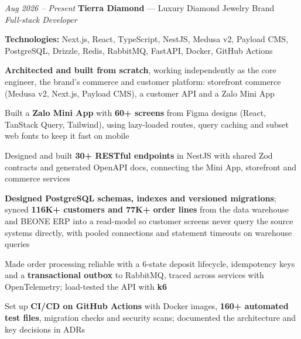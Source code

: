 \begin{twocolentry}{\textit{Aug 2026 -- Present}}
    \textbf{Tierra Diamond} --- Luxury Diamond Jewelry Brand \\[4pt]
    \textit{Full-stack Developer}
\end{twocolentry}
\begin{onecolentry}
    \begin{highlights}
        \item \textbf{Technologies:} Next.js, React, TypeScript, NestJS, Medusa v2, Payload CMS, PostgreSQL, Drizzle, Redis, RabbitMQ, FastAPI, Docker, GitHub Actions
        \item \textbf{Architected and built from scratch}, working independently as the core engineer, the brand's commerce and customer platform: storefront commerce (Medusa v2, Next.js, Payload CMS), a customer API and a Zalo Mini App
        \item Built a \textbf{Zalo Mini App} with \textbf{60+ screens} from Figma designs (React, TanStack Query, Tailwind), using lazy-loaded routes, query caching and subset web fonts to keep it fast on mobile
        \item Designed and built \textbf{30+ RESTful endpoints} in NestJS with shared Zod contracts and generated OpenAPI docs, connecting the Mini App, storefront and commerce services
        \item \textbf{Designed PostgreSQL schemas, indexes and versioned migrations}; synced \textbf{116K+ customers and 77K+ order lines} from the data warehouse and BEONE ERP into a read-model so customer screens never query the source systems directly, with pooled connections and statement timeouts on warehouse queries
        \item Made order processing reliable with a 6-state deposit lifecycle, idempotency keys and a \textbf{transactional outbox} to RabbitMQ, traced across services with OpenTelemetry; load-tested the API with \textbf{k6}
        \item Set up \textbf{CI/CD on GitHub Actions} with Docker images, \textbf{160+ automated test files}, migration checks and security scans; documented the architecture and key decisions in ADRs
    \end{highlights}
\end{onecolentry}
\vspace{0.2 cm}

